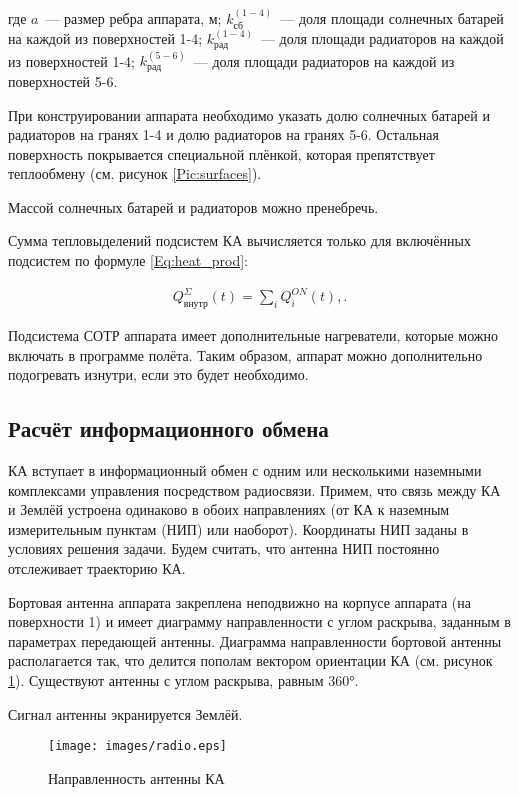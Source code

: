 \documentclass[12pt,a4paper]{article}
\begin{document}
где $a$~--- размер ребра аппарата, м; $k^{(1-4)}_{\text{сб}}$~--- доля площади солнечных батарей на каждой из
поверхностей 1-4; $k^{(1-4)}_{\text{рад}}$~--- доля площади радиаторов на каждой из поверхностей 1-4;
$k^{(5-6)}_{\text{рад}}$~--- доля площади радиаторов на каждой из поверхностей 5-6.

При конструировании аппарата необходимо указать долю солнечных батарей и радиаторов на
гранях 1-4 и долю радиаторов на гранях 5-6. Остальная поверхность покрывается специальной
плёнкой, которая препятствует теплообмену (см. рисунок \ref{Pic:surfaces}).

Массой солнечных батарей и радиаторов можно пренебречь.

Сумма тепловыделений подсистем КА вычисляется только для включённых подсистем по формуле
\ref{Eq:heat_prod}:

\begin{eqnarray}
Q^{\Sigma}_{\text{внутр}}(t) = \sum_i Q_{i}^{ON}(t), \label{Eq:heat_prod}.
\end{eqnarray}

Подсистема СОТР аппарата имеет дополнительные нагреватели, которые можно включать в
программе полёта. Таким образом, аппарат можно дополнительно подогревать изнутри, если это
будет необходимо.

\subsection{Расчёт информационного обмена}

КА вступает в информационный обмен с одним или несколькими наземными комплексами
управления посредством радиосвязи. Примем, что связь между КА и Землёй устроена одинаково
в обоих направлениях (от КА к наземным измерительным пунктам (НИП) или
наоборот). Координаты НИП заданы в условиях решения задачи. Будем считать, что антенна НИП
постоянно отслеживает траекторию КА.

Бортовая антенна аппарата закреплена неподвижно на корпусе аппарата (на поверхности 1) и
имеет диаграмму направленности с углом раскрыва, заданным в параметрах передающей
антенны. Диаграмма направленности бортовой антенны располагается так, что делится пополам
вектором ориентации КА (см. рисунок \ref{Pic:Radio}). Существуют антенны с углом раскрыва, равным 360°.

Сигнал антенны экранируется Землёй.

\begin{figure}[tbh]
  \begin{center}
    \texttt{[image: images/radio.eps]}
    \caption{Направленность антенны КА}
    \label{Pic:Radio}
  \end{center}
\end{figure}
\end{document}
